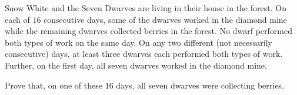Snow White and the Seven Dwarves are living in their house in the forest. On each of $16$ consecutive days, some of the dwarves worked in the diamond mine while the remaining dwarves collected berries in the forest. No dwarf performed both types of work on the same day. On any two different (not necessarily consecutive) days, at least three dwarves each performed both types of work. Further, on the first day, all seven dwarves worked in the diamond mine.

Prove that, on one of these $16$ days, all seven dwarves were collecting berries.